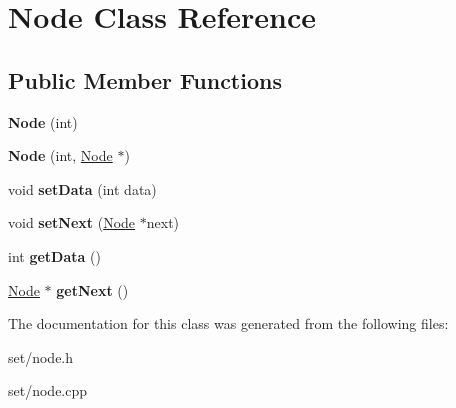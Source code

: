 \hypertarget{classNode}{\section{Node Class Reference}
\label{classNode}
}
\subsection*{Public Member Functions}
\begin{DoxyCompactItemize}
\item 
\hypertarget{classNode_aff71d952af8363f046a67a8b12194e46}{{\bfseries Node} (int)}\label{classNode_aff71d952af8363f046a67a8b12194e46}

\item 
\hypertarget{classNode_aff31c12e14a6f00952a46ff967db0c96}{{\bfseries Node} (int, \hyperlink{classNode}{Node} $\ast$)}\label{classNode_aff31c12e14a6f00952a46ff967db0c96}

\item 
\hypertarget{classNode_a2da744e4e704b0e2684e0d7476cf8c26}{void {\bfseries set\-Data} (int data)}\label{classNode_a2da744e4e704b0e2684e0d7476cf8c26}

\item 
\hypertarget{classNode_ae0062432733265c491000494625c3a04}{void {\bfseries set\-Next} (\hyperlink{classNode}{Node} $\ast$next)}\label{classNode_ae0062432733265c491000494625c3a04}

\item 
\hypertarget{classNode_aca98907146d5d0687f48bf8be9df9b7d}{int {\bfseries get\-Data} ()}\label{classNode_aca98907146d5d0687f48bf8be9df9b7d}

\item 
\hypertarget{classNode_ae36639ff267d63e058ce309fde5a9913}{\hyperlink{classNode}{Node} $\ast$ {\bfseries get\-Next} ()}\label{classNode_ae36639ff267d63e058ce309fde5a9913}

\end{DoxyCompactItemize}


The documentation for this class was generated from the following files\-:\begin{DoxyCompactItemize}
\item 
set/node.\-h\item 
set/node.\-cpp\end{DoxyCompactItemize}
